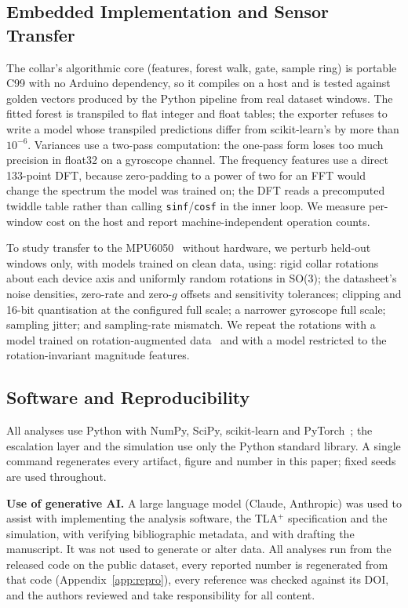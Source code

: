 \subsection{Embedded Implementation and Sensor Transfer}
\label{sec:embedded}
The collar's algorithmic core (features, forest walk, gate, sample ring) is portable C99 with no Arduino dependency, so it compiles on a host and is tested against golden vectors produced by the Python pipeline from real dataset windows. The fitted forest is transpiled to flat integer and float tables; the exporter refuses to write a model whose transpiled predictions differ from scikit-learn's by more than $10^{-6}$. Variances use a two-pass computation: the one-pass form loses too much precision in float32 on a gyroscope channel. The frequency features use a direct 133-point DFT, because zero-padding to a power of two for an FFT would change the spectrum the model was trained on; the DFT reads a precomputed twiddle table rather than calling \texttt{sinf}/\texttt{cosf} in the inner loop. We measure per-window cost on the host and report machine-independent operation counts.

To study transfer to the MPU6050~\cite{invensense2013mpu6000} without hardware, we perturb held-out windows only, with models trained on clean data, using: rigid collar rotations about each device axis and uniformly random rotations in SO(3); the datasheet's noise densities, zero-rate and zero-$g$ offsets and sensitivity tolerances; clipping and 16-bit quantisation at the configured full scale; a narrower gyroscope full scale; sampling jitter; and sampling-rate mismatch. We repeat the rotations with a model trained on rotation-augmented data~\cite{um2017augmentation} and with a model restricted to the rotation-invariant magnitude features.

\subsection{Software and Reproducibility}
All analyses use Python with NumPy, SciPy, scikit-learn and PyTorch~\cite{harris2020numpy,virtanen2020scipy,pedregosa2011sklearn,paszke2019pytorch}; the escalation layer and the simulation use only the Python standard library. A single command regenerates every artifact, figure and number in this paper; fixed seeds are used throughout.

\textbf{Use of generative AI.} A large language model (Claude, Anthropic) was used to assist with implementing the analysis software, the TLA$^+$ specification and the simulation, with verifying bibliographic metadata, and with drafting the manuscript. It was not used to generate or alter data. All analyses run from the released code on the public dataset, every reported number is regenerated from that code (Appendix~\ref{app:repro}), every reference was checked against its DOI, and the authors reviewed and take responsibility for all content.

